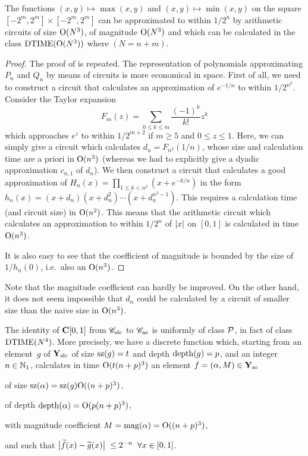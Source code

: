 \begin{proposition} \label{426}
The functions $(x,y) \mapsto \max(x,y)$ and $(x,y) \mapsto \min(x,y)$ on the square $[-2^m, 2^m] \times [-2^m, 2^m]$ can be approximated to within $1/2^n$ by arithmetic circuits of size ${\rm O}(N^3)$, of magnitude ${\rm O}(N^3)$ and which can be calculated in the class ${\rm DTIME} ({\rm O}(N^3))$ where  $(N = n+m)$.
\end{proposition} 

\begin{proof} 
The proof of  is repeated. The representation of polynomials 
approximating $ P_n $ and $ Q_n $ by means of circuits is more economical in space. First of all, we need to construct a circuit that calculates an 
approximation of $ e^{-1/n} $ to within $1/2^{n^3}$. 
Consider the Taylor expansion 
\[
F_m(z) = \sum_{0\leq k\leq m} \frac{(-1)^k}{k!} z^k
\] 
which approaches $ e^{z}$ to within $1/2^{m+2}$ if $m\geq 5$ and $0\leq z\leq 1$. 
Here, we can simply give a circuit which calculates $d_n = F_{n^3}(1/n)$, 
whose size and calculation time are a priori in $ {\rm O}(n^3) $ (whereas we 
had to explicitly give a dyadic approximation $c_{n,1}$ of $d_n$). 
We then construct a circuit that calculates a good approximation of $H_n(x) = \prod_{1 \leq k < n^2} (x+e^{-k/n})$ in the form $h_n(x) = (x+d_n)(x+d_n^2)\cdots(x+d_n^{n^2-1})$.
This requires a calculation time (and circuit size) in ${\rm O}(n^2)$. 
This means that the arithmetic circuit which calculates an approximation to within 
$1/2^n$ of $\left|{x}\right|$ on $[0,1]$ 
is calculated in time ${\rm O}(n^3)$. 
 
\noindent It is also easy to see that the coefficient of magnitude is bounded by the size of $1/h_n(0)$, i.e.\ also an ${\rm O}(n^3)$. 	 
\end{proof}
 

Note that the magnitude coefficient can hardly be improved. 
On the other hand, it does not seem impossible that $ d_n $ could be 
 calculated by a circuit of smaller size than the naive size in ${\rm O}(n^3)$.

\begin{proposition} \label{427}
The identity of ${{\bf C}[0,1]}$ from ${{{\mathscr C}}_{\rm slc}}$ to ${{{\mathscr C}}_{\rm ac}}$ is uniformly of class ${\cal P}$, in fact of class ${\rm DTIME} (N^4)$. More precisely, we have a discrete function which, starting from an element~$g$ of ${{\bf Y}_{\rm slc}}$ of size 
${\rm sz}(g) = t $ and depth $ {\rm depth}(g) = p $, and an integer 
$n \in \mathbb {N}_1$, calculates in time $ {\rm O}( t (n+p)^3 ) $ an element 
$f = (\alpha,M) \in {{\bf Y}_{\rm ac}}$

\noindent 
\spa of size $ {\rm sz}(\alpha) = {\rm sz}(g) {\rm O}((n+p)^3) $, 

\noindent 
\spa of depth $ {\rm depth}(\alpha) = {\rm O}(p(n+p)^3) $, 

\noindent 
\spa with magnitude coefficient $ M = {\rm mag}(\alpha) = {\rm O}((n+p)^3) $, 

\noindent 
and such that $\big|{\widetilde{f}(x)-\widetilde{g}(x)}\big|\; \leq 2^{-n} \; \; \forall x \in [0,1]$. 
\end{proposition} 


